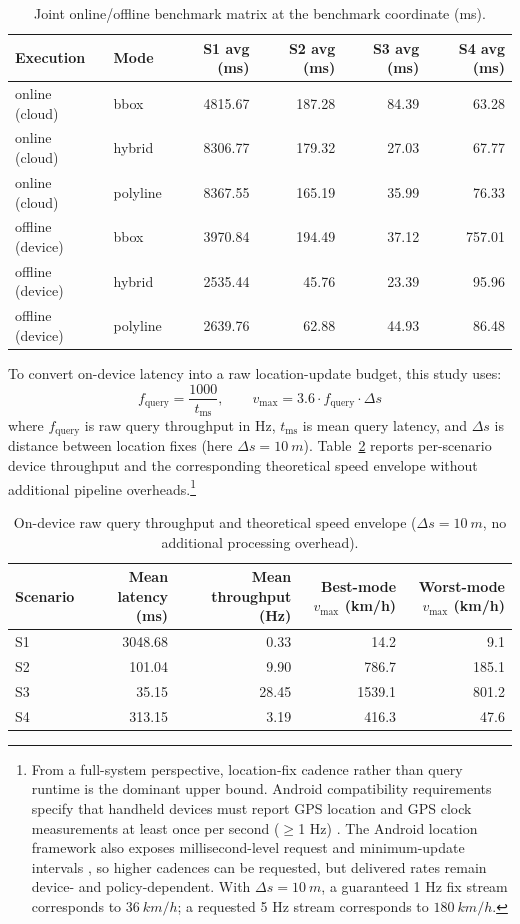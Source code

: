 \documentclass{article}
\begin{document}
\begin{table}[!htbp]
\centering
\caption{Joint online/offline benchmark matrix at the benchmark coordinate (\si{\milli\second}).}
\label{tab:bench_joint}
\begin{tabular}{llrrrr}
\toprule
Execution & Mode & S1 avg (ms) & S2 avg (ms) & S3 avg (ms) & S4 avg (ms) \\
\midrule
online (cloud) & bbox     & 4815.67 & 187.28 & 84.39 & 63.28 \\
online (cloud) & hybrid   & 8306.77 & 179.32 & 27.03 & 67.77 \\
online (cloud) & polyline & 8367.55 & 165.19 & 35.99 & 76.33 \\
\midrule
offline (device) & bbox     & 3970.84 & 194.49 & 37.12 & 757.01 \\
offline (device) & hybrid   & 2535.44 & 45.76 & 23.39 & 95.96 \\
offline (device) & polyline & 2639.76 & 62.88 & 44.93 & 86.48 \\
\bottomrule
\end{tabular}
\end{table}

To convert on-device latency into a raw location-update budget, this study uses:
\[
f_{\text{query}}=\frac{1000}{t_{\text{ms}}}, \qquad
v_{\max}=3.6 \cdot f_{\text{query}} \cdot \Delta s
\]
where \(f_{\text{query}}\) is raw query throughput in Hz, \(t_{\text{ms}}\) is mean query latency, and \(\Delta s\) is distance between location fixes (here \(\Delta s=\SI{10}{m}\)). Table~\ref{tab:device_speed_envelope} reports per-scenario device throughput and the corresponding theoretical speed envelope without additional pipeline overheads.\footnote{From a full-system perspective, location-fix cadence rather than query runtime is the dominant upper bound. Android compatibility requirements specify that handheld devices must report GPS location and GPS clock measurements at least once per second (\(\geq\)1 Hz) \cite{android_cdd16}. The Android location framework also exposes millisecond-level request and minimum-update intervals \cite{android_locationrequest_aosp}, so higher cadences can be requested, but delivered rates remain device- and policy-dependent. With \(\Delta s=\SI{10}{m}\), a guaranteed 1 Hz fix stream corresponds to \(\SI{36}{km/h}\); a requested 5 Hz stream corresponds to \(\SI{180}{km/h}\).}

\begin{table}[!htbp]
\centering
\caption{On-device raw query throughput and theoretical speed envelope (\(\Delta s=\SI{10}{m}\), no additional processing overhead).}
\label{tab:device_speed_envelope}
\begin{tabular}{lrrrr}
\toprule
Scenario & Mean latency (ms) & Mean throughput (Hz) & Best-mode \(v_{\max}\) (km/h) & Worst-mode \(v_{\max}\) (km/h) \\
\midrule
S1 & 3048.68 & 0.33 & 14.2 & 9.1 \\
S2 & 101.04 & 9.90 & 786.7 & 185.1 \\
S3 & 35.15 & 28.45 & 1539.1 & 801.2 \\
S4 & 313.15 & 3.19 & 416.3 & 47.6 \\
\bottomrule
\end{tabular}
\end{table}
\end{document}
